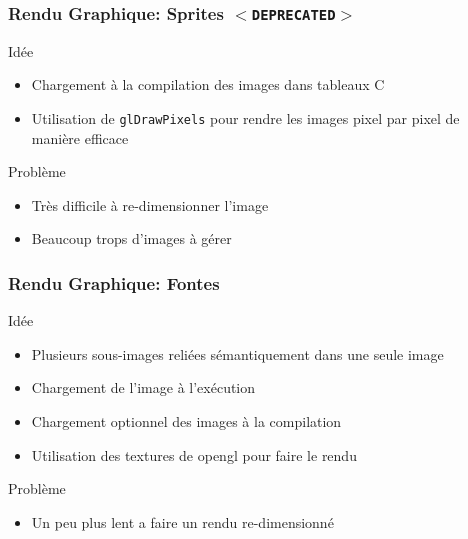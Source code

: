 \documentclass{beamer}
\newcommand{\<}[1]{\`#1}
\begin{document}
\begin{frame}
  \frametitle{Rendu Graphique: Sprites $<$\texttt{DEPRECATED}$>$}
  \begin{block}{Idée}
    \begin{itemize}
    \item Chargement à la compilation des images dans tableaux C
    \item Utilisation de \texttt{glDrawPixels} pour rendre les images
      pixel par pixel de manière efficace
    \end{itemize}
  \end{block}
  
  \begin{block}{Problème}
    \begin{itemize}
    \item Très difficile à re-dimensionner l'image
    \item Beaucoup trops d'images à gérer
    \end{itemize}
  \end{block}
\end{frame}

\begin{frame}
  \frametitle{Rendu Graphique: Fontes}
  \begin{block}{Idée}
    \begin{itemize}
    \item Plusieurs sous-images reliées sémantiquement dans une seule
      image
    \item Chargement de l'image à l'exécution
    \item Chargement optionnel des images à la compilation
    \item Utilisation des textures de opengl pour faire le rendu
    \end{itemize}
  \end{block}
  
  \begin{block}{Problème}
    \begin{itemize}
    \item Un peu plus lent a faire un rendu re-dimensionné
    \end{itemize}
  \end{block}
\end{frame}
\end{document}
